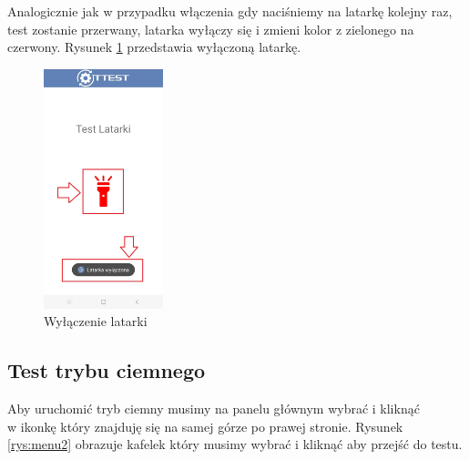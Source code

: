 Analogicznie jak w przypadku włączenia gdy naciśniemy na latarkę kolejny raz, test zostanie przerwany, latarka wyłączy się i zmieni kolor z zielonego na czerwony. Rysunek \ref{rys:latarka3} przedstawia wyłączoną latarkę.

\begin{figure}[!hbt]
	\begin{center}
		\includegraphics[angle=360, width=0.31\textwidth]{rys/punkt6/latarka3.jpg}
		\caption{Wyłączenie latarki}
		\label{rys:latarka3}
	\end{center}
\end{figure}

\newpage


\subsection{Test trybu ciemnego}

\hspace{0.60cm}Aby uruchomić tryb ciemny musimy na panelu głównym wybrać i kliknąć \\ w ikonkę który znajduję się na samej górze po prawej stronie. Rysunek \ref{rys:menu2} obrazuje kafelek który musimy wybrać i kliknąć aby przejść do testu.


